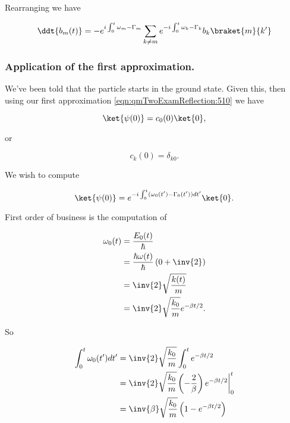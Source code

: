 Rearranging we have

\begin{equation}\label{eqn:qmTwoExamReflection:550}
\ddt{b_m(t)} = 
-
e^{i \int_0^t  \omega_m - \Gamma_m } 
\sum_{k\ne m} e^{-i \int_0^t \omega_k - \Gamma_k } b_k \braket{m}{k'} 
\end{equation}

\subsubsection{Application of the first approximation.}

We've been told that the particle starts in the ground state.  Given this, then using our first approximation \ref{eqn:qmTwoExamReflection:510} we have

\begin{equation}\label{eqn:qmTwoExamReflection:730}
\ket{\psi(0)} = c_0(0) \ket{0},
\end{equation}

or

\begin{equation}\label{eqn:qmTwoExamReflection:750}
c_k(0) = \delta_{k 0}.
\end{equation}

We wish to compute

\begin{equation}\label{eqn:qmTwoExamReflection:770}
\ket{\psi(0)} = e^{-i \int_0^t (\omega_0(t') - \Gamma_0(t')) dt'} \ket{0}.
\end{equation}

First order of business is the computation of

\begin{align*}
\omega_0(t) 
&= \frac{E_0(t)}{\hbar} \\
&= \frac{\hbar \omega(t)}{\hbar}\left( 0 + \inv{2} \right) \\
&= \inv{2} \sqrt{\frac{k(t)}{m}} \\
&= \inv{2} \sqrt{\frac{k_0}{m}} e^{-\beta t/2}.
\end{align*}

So

\begin{align*}
\int_0^t \omega_0(t') dt'
&= 
\inv{2} \sqrt{\frac{k_0}{m}} 
\int_0^t e^{-\beta t/2} \\
&= 
\inv{2} \sqrt{\frac{k_0}{m}} 
{\left.{ \left(-\frac{2}{\beta}\right) e^{-\beta t/2} }\right\vert}_0^t \\
&= 
\inv{\beta} \sqrt{\frac{k_0}{m}} 
\left( 1 - e^{-\beta t/2} \right)
\end{align*}

